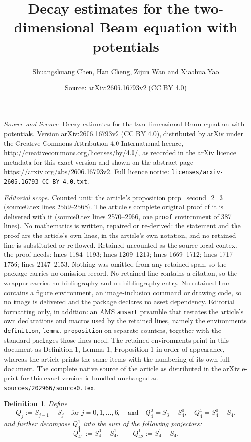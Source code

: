 \documentclass[10pt,a4paper]{amsart}
\title{Decay estimates for the two-dimensional Beam equation with potentials}
\author{Shuangshuang Chen, Han Cheng, Zijun Wan and Xiaohua Yao\textsuperscript{\dag}}
\date{Source: arXiv:2606.16793v2 (CC BY 4.0)}
\newtheorem{definition}{Definition}
\begin{document}
\maketitle

\noindent\emph{Source and licence.} Decay estimates for the two-dimensional Beam equation with potentials. Version arXiv:2606.16793v2 (CC BY 4.0), distributed by arXiv under the Creative Commons Attribution 4.0 International licence, http://creativecommons.org/licenses/by/4.0/, as recorded in the arXiv licence metadata for this exact version and shown on the abstract page https://arxiv.org/abs/2606.16793v2. Full licence notice: \texttt{licenses/arxiv-2606.16793-CC-BY-4.0.txt}.\par\smallskip

\noindent\textit{Editorial scope.} Counted unit: the article's proposition prop\_second\_2\_3 (source0.tex lines 2559--2568). The article's complete original proof of it is delivered with it (source0.tex lines 2570--2956, one \texttt{proof} environment of 387 lines). No mathematics is written, repaired or re-derived: the statement and the proof are the article's own lines, in the article's own notation, and no retained line is substituted or re-flowed.  Retained uncounted as the source-local context the proof needs: lines 1184--1193; lines 1209--1213; lines 1669--1712; lines 1717--1756; lines 2147--2153.  Nothing was omitted from any retained span, so the package carries no omission record.  No retained line contains a citation, so the wrapper carries no bibliography and no bibliography entry.  No retained line contains a figure environment, an image-inclusion command or drawing code, so no image is delivered and the package declares no asset dependency.  Editorial formatting only, in addition: an AMS \texttt{amsart} preamble that restates the article's own declarations and macros used by the retained lines, namely the environments \texttt{definition}, \texttt{lemma}, \texttt{proposition} on separate counters, together with the standard packages those lines need.  The retained environments print in this document as Definition 1, Lemma 1, Proposition 1 in order of appearance, whereas the article prints the same items with the numbering of its own full document.  The complete native source of the article as distributed in the arXiv e-print for this exact version is bundled unchanged as \texttt{sources/202966/source0.tex}.
\begin{definition}\label{defQ}
Define
$$
	Q_j := S_{j-1} - S_j \quad \text{for } j = 0,1,\dots,6, \quad \text{and} \quad Q_4^0 = S_3 - S_4^0, \quad Q_4^1 = S_4^0 - S_4.
$$
and further decompose $Q_4^1$ into the sum of the following projectors:
$$
Q_{41}^1 := S_4^0 - S_4^1, \qquad Q_{42}^1 := S_4^1 - S_4. 
$$
\end{definition}
\end{document}
